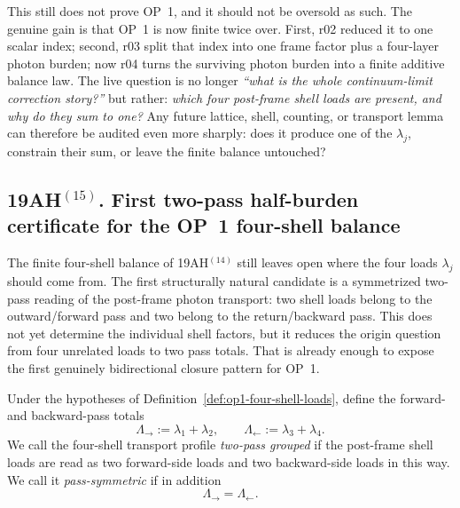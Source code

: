 \begin{remark}
This still does not prove OP~1, and it should not be oversold as such. The genuine gain is that OP~1 is now finite twice over. First, r02 reduced it to one scalar index; second, r03 split that index into one frame factor plus a four-layer photon burden; now r04 turns the surviving photon burden into a finite additive balance law. The live question is no longer \emph{``what is the whole continuum-limit correction story?''} but rather: \emph{which four post-frame shell loads are present, and why do they sum to one?} Any future lattice, shell, counting, or transport lemma can therefore be audited even more sharply: does it produce one of the \(\lambda_j\), constrain their sum, or leave the finite balance untouched?
\end{remark}

\subsection*{19AH$^{(15)}$. First two-pass half-burden certificate for the OP~1 four-shell balance}
The finite four-shell balance of 19AH$^{(14)}$ still leaves open where the four loads \(\lambda_j\) should come from. The first structurally natural candidate is a symmetrized two-pass reading of the post-frame photon transport: two shell loads belong to the outward/forward pass and two belong to the return/backward pass. This does not yet determine the individual shell factors, but it reduces the origin question from four unrelated loads to two pass totals. That is already enough to expose the first genuinely bidirectional closure pattern for OP~1.

\begin{definition}
\label{def:op1-two-pass-loads}
Under the hypotheses of Definition~\ref{def:op1-four-shell-loads}, define the forward- and backward-pass totals
\[
  \Lambda_{\rightarrow} := \lambda_1+\lambda_2,
  \qquad
  \Lambda_{\leftarrow} := \lambda_3+\lambda_4.
\]
We call the four-shell transport profile \emph{two-pass grouped} if the post-frame shell loads are read as two forward-side loads and two backward-side loads in this way. We call it \emph{pass-symmetric} if in addition
\[
  \Lambda_{\rightarrow}=\Lambda_{\leftarrow}.
\]
\end{definition}

